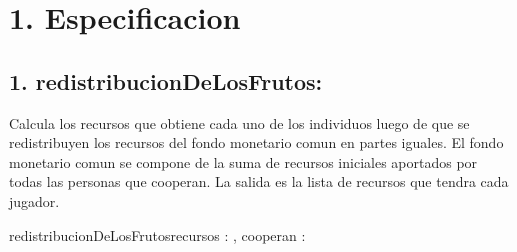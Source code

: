 \documentclass[10pt,a4paper]{article}
\begin{document}
\maketitle

\section{1. Especificacion}




\subsection*{1. redistribucionDeLosFrutos:}
	Calcula los recursos que obtiene cada uno de los individuos luego de que se redistribuyen
	los recursos del fondo monetario comun en partes iguales. El fondo monetario comun se compone de la suma de recursos
	iniciales aportados por todas las personas que cooperan. La salida es la lista de recursos que tendra cada jugador.

	\begin{proc}{redistribucionDeLosFrutos}{\In recursos : \TLista{\float}, \In cooperan : \TLista{\bool}}{\TLista{\float}}
		\hfill 

		{ 
		}

		\hfill 

		{
		}

		\hfill 
		

		\hfill 


		

	\end{proc}
	
\end{document}
